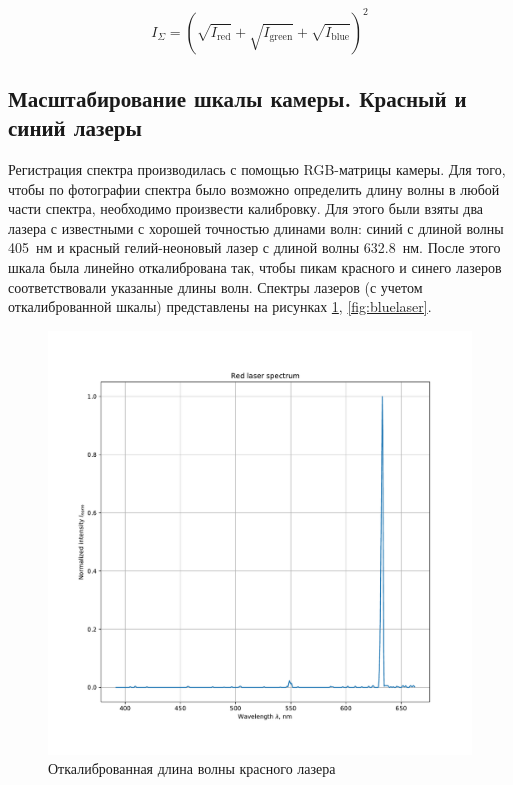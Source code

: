 \documentclass[a4paper, 12pt]{article}
\begin{document}
\begin{equation}
	I_\Sigma = \left(\sqrt{I_\text{red}} + \sqrt{I_\text{green}} + \sqrt{I_\text{blue}}\right) ^ 2
	\label{eq:main}
\end{equation}

\subsection{Масштабирование шкалы камеры. Красный и синий лазеры}

Регистрация спектра производилась с помощью RGB-матрицы камеры. Для того, чтобы по фотографии спектра было возможно определить длину волны в любой части спектра, необходимо произвести калибровку. Для этого были взяты два лазера с известными с хорошей точностью длинами волн: синий с длиной волны 405~нм и красный гелий-неоновый лазер с длиной волны 632.8~нм. После этого шкала была линейно откалибрована так, чтобы пикам красного и синего лазеров соответствовали указанные длины волн. Спектры лазеров (с учетом откалиброванной шкалы) представлены на рисунках \ref{fig:redlaser}, \ref{fig:bluelaser}.

\begin{figure}[H]
	\centering
	\includegraphics[width=0.7\linewidth]{redlaser}
	\caption{Откалиброванная длина волны красного лазера}
	\label{fig:redlaser}
\end{figure}
\end{document}
